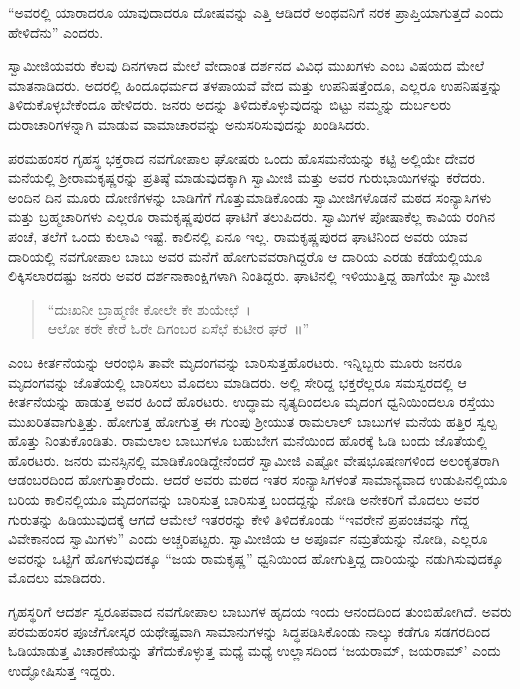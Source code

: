  “ಅವರಲ್ಲಿ ಯಾರಾದರೂ ಯಾವುದಾದರೂ ದೋಷವನ್ನು ಎತ್ತಿ ಆಡಿದರೆ ಅಂಥವನಿಗೆ ನರಕ ಪ್ರಾಪ್ತಿಯಾಗುತ್ತದೆ ಎಂದು ಹೇಳಿದೆನು” ಎಂದರು. 

 ಸ್ವಾಮೀಜಿಯವರು ಕೆಲವು ದಿನಗಳಾದ ಮೇಲೆ ವೇದಾಂತ ದರ್ಶನದ ವಿವಿಧ ಮುಖಗಳು ಎಂಬ ವಿಷಯದ ಮೇಲೆ ಮಾತನಾಡಿದರು. ಅದರಲ್ಲಿ ಹಿಂದೂಧರ್ಮದ ತಳಪಾಯವೆ ವೇದ ಮತ್ತು ಉಪನಿಷತ್ತೆಂದೂ, ಎಲ್ಲರೂ ಉಪನಿಷತ್ತನ್ನು ತಿಳಿದುಕೊಳ್ಳಬೇಕೆಂದೂ ಹೇಳಿದರು. ಜನರು ಅದನ್ನು ತಿಳಿದುಕೊಳ್ಳುವುದನ್ನು ಬಿಟ್ಟು ನಮ್ಮನ್ನು ದುರ್ಬಲರು ದುರಾಚಾರಿಗಳನ್ನಾಗಿ ಮಾಡುವ ವಾಮಾಚಾರವನ್ನು ಅನುಸರಿಸುವುದನ್ನು ಖಂಡಿಸಿದರು. 

 ಪರಮಹಂಸರ ಗೃಹಸ್ಥ ಭಕ್ತರಾದ ನವಗೋಪಾಲ ಘೋಷರು ಒಂದು ಹೊಸಮನೆಯನ್ನು ಕಟ್ಟಿ ಅಲ್ಲಿಯೇ ದೇವರ ಮನೆಯಲ್ಲಿ ಶ‍್ರೀರಾಮಕೃಷ್ಣರನ್ನು ಪ್ರತಿಷ್ಠೆ ಮಾಡುವುದಕ್ಕಾಗಿ ಸ್ವಾಮೀಜಿ ಮತ್ತು ಅವರ ಗುರುಭಾಯಿಗಳನ್ನು ಕರೆದರು. ಅಂದಿನ ದಿನ ಮೂರು ದೋಣಿಗಳನ್ನು ಬಾಡಿಗೆಗೆ ಗೊತ್ತುಮಾಡಿಕೊಂಡು ಸ್ವಾಮೀಜಿಗಳೊಡನೆ ಮಠದ ಸಂನ್ಯಾಸಿಗಳು ಮತ್ತು ಬ್ರಹ್ಮಚಾರಿಗಳು ಎಲ್ಲರೂ ರಾಮಕೃಷ್ಣಪುರದ ಘಾಟಿಗೆ ತಲುಪಿದರು. ಸ್ವಾಮಿಗಳ ಪೋಷಾಕೆಲ್ಲ ಕಾವಿಯ ರಂಗಿನ ಪಂಚೆ, ತಲೆಗೆ ಒಂದು ಕುಲಾವಿ ಇಷ್ಟೆ. ಕಾಲಿನಲ್ಲಿ ಏನೂ ಇಲ್ಲ. ರಾಮಕೃಷ್ಣಪುರದ ಘಾಟಿನಿಂದ ಅವರು ಯಾವ ದಾರಿಯಲ್ಲಿ ನವಗೋಪಾಲ ಬಾಬು ಅವರ ಮನೆಗೆ ಹೋಗುವವರಾಗಿದ್ದರೊ ಆ ದಾರಿಯ ಎರಡು ಕಡೆಯಲ್ಲಿಯೂ ಲಿಕ್ಕಿಸಲಾರದಷ್ಟು ಜನರು ಅವರ ದರ್ಶನಾಕಾಂಕ್ಷಿಗಳಾಗಿ ನಿಂತಿದ್ದರು. ಘಾಟಿನಲ್ಲಿ ಇಳಿಯುತ್ತಿದ್ದ ಹಾಗೆಯೇ ಸ್ವಾಮೀಜಿ

\begin{verse}
“ದುಃಖನೀ ಬ್ರಾಹ್ಮಣೀ ಕೋಲೇ ಕೇ ಶುಯೇಛೆ~।\\ಆಲೋ ಕರೇ ಕೇರೆ ಓರೇ ದಿಗಂಬರ ಏಸೆಛೆ ಕುಟೀರ ಘರೆ~॥”
\end{verse}

 ಎಂಬ ಕೀರ್ತನೆಯನ್ನು ಆರಂಭಿಸಿ ತಾವೇ ಮೃದಂಗವನ್ನು ಬಾರಿಸುತ್ತ\break ಹೊರಟರು. ಇನ್ನಿಬ್ಬರು ಮೂರು ಜನರೂ‌ ಮೃದಂಗವನ್ನು ಜೊತೆಯಲ್ಲಿ ಬಾರಿಸಲು ಮೊದಲು ಮಾಡಿದರು. ಅಲ್ಲಿ ಸೇರಿದ್ದ ಭಕ್ತರೆಲ್ಲರೂ‌ ಸಮಸ್ವರದಲ್ಲಿ ಆ ಕೀರ್ತನೆಯನ್ನು ಹಾಡುತ್ತ ಅವರ ಹಿಂದೆ ಹೊರಟರು. ಉದ್ಧಾಮ ನೃತ್ಯದಿಂದಲೂ ಮೃದಂಗ ಧ್ವನಿಯಿಂದಲೂ ರಸ್ತೆಯು ಮುಖರಿತವಾಗುತ್ತಿತ್ತು. ಹೋಗುತ್ತ ಹೋಗುತ್ತ ಈ ಗುಂಪು ಶ‍್ರೀಯುತ ರಾಮಲಾಲ್ ಬಾಬುಗಳ ಮನೆಯ ಹತ್ತಿರ ಸ್ವಲ್ಪ ಹೊತ್ತು ನಿಂತುಕೊಂಡಿತು. ರಾಮಲಾಲ ಬಾಬುಗಳೂ ಬಹುಬೇಗ ಮನೆಯಿಂದ ಹೊರಕ್ಕೆ ಓಡಿ ಬಂದು ಜೊತೆಯಲ್ಲಿ ಹೊರಟರು. ಜನರು ಮನಸ್ಸಿನಲ್ಲಿ ಮಾಡಿಕೊಂಡಿದ್ದೇನೆಂದರೆ ಸ್ವಾಮೀಜಿ ಎಷ್ಟೋ ವೇಷಭೂಷಣಗಳಿಂದ ಅಲಂಕೃತರಾಗಿ ಆಡಂಬರದಿಂದ ಹೋಗುತ್ತಾರೆಂದು. ಆದರೆ ಅವರು ಮಠದ ಇತರ ಸಂನ್ಯಾಸಿಗಳಂತೆ ಸಾಮಾನ್ಯವಾದ ಉಡುಪಿನಲ್ಲಿಯೂ ಬರಿಯ ಕಾಲಿನಲ್ಲಿಯೂ ಮೃದಂಗವನ್ನು ಬಾರಿಸುತ್ತ ಬಾರಿಸುತ್ತ ಬಂದದ್ದನ್ನು ನೋಡಿ ಅನೇಕರಿಗೆ ಮೊದಲು ಅವರ ಗುರುತನ್ನು ಹಿಡಿಯುವುದಕ್ಕೆ ಆಗದೆ ಆಮೇಲೆ ಇತರರನ್ನು ಕೇಳಿ ತಿಳಿದಕೊಂಡು “ಇವರೇನೆ ಪ್ರಪಂಚವನ್ನು ಗೆದ್ದ ವಿವೇಕಾನಂದ ಸ್ವಾಮಿಗಳು” ಎಂದು ಅಚ್ಚರಿಪಟ್ಟರು. ಸ್ವಾಮೀಜಿಯ ಆ ಅಪೂರ್ವ ನಮ್ರತೆಯನ್ನು ನೋಡಿ, ಎಲ್ಲರೂ ಅವರನ್ನು ಒಟ್ಟಿಗೆ ಹೊಗಳುವುದಕ್ಕೂ “ಜಯ ರಾಮಕೃಷ್ಣ” ಧ್ವನಿಯಿಂದ ಹೋಗುತ್ತಿದ್ದ ದಾರಿಯನ್ನು ನಡುಗಿಸುವುದಕ್ಕೂ ಮೊದಲು ಮಾಡಿದರು. 

 ಗೃಹಸ್ಥರಿಗೆ ಆದರ್ಶ ಸ್ವರೂಪವಾದ ನವಗೋಪಾಲ ಬಾಬುಗಳ ಹೃದಯ ಇಂದು ಆನಂದದಿಂದ ತುಂಬಿಹೋಗಿದೆ. ಅವರು ಪರಮಹಂಸರ ಪೂಜೆಗೋಸ್ಕರ ಯಥೇಷ್ಟವಾಗಿ ಸಾಮಾನುಗಳನ್ನು ಸಿದ್ಧಪಡಿಸಿಕೊಂಡು ನಾಲ್ಕು ಕಡೆಗೂ ಸಡಗರದಿಂದ ಓಡಿಯಾಡುತ್ತ ವಿಚಾರಣೆಯನ್ನು ತೆಗೆದುಕೊಳ್ಳುತ್ತ ಮಧ್ಯೆ ಮಧ್ಯೆ ಉಲ್ಲಾಸದಿಂದ ‘ಜಯರಾಮ್, ಜಯರಾಮ್’ ಎಂದು ಉದ್ಘೋಷಿಸುತ್ತ ಇದ್ದರು. 

